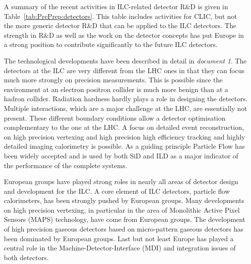 \documentclass[%
 reprint,
 amsmath,amssymb,
 aps,
]{revtex4-1}
\begin{document}


A summary of the recent  activities in ILC-related detector R\&D is given in Table~\ref{tab:PrePrep:detectors}. 
This table includes activities for CLIC, but not the more generic detector R\&D that can be applied to the 
ILC detectors. The strength in R\&D as well as the work on the detector concepts has put Europe in a strong 
position to contribute significantly to the future ILC detectors.


The technological developments have been described in detail in {\it document 
1}. The detectors at the ILC are very different from the LHC ones in that they 
can focus much more strongly on precision measurements. This is possible since 
the environment at an electron positron collider is much more benign than at a 
hadron collider. Radiation hardness hardly plays a role in designing the 
detectors. Multiple interactions, which are a major challenge at the LHC, are 
essentially not present. These different boundary conditions allow a detector 
optimisation complementary to the one at the LHC. A focus on detailed event 
reconstruction, on high precision vertexing and high precision high efficiency 
tracking and highly detailed imaging calorimetry is possible. As a guiding 
principle Particle Flow has been widely accepted and is used by both SiD and ILD 
as a major indicator of the performance of the complete systems. 

European groups have played strong roles in nearly all areas of detector design 
and development for the ILC. A core element of ILC detectors, particle flow 
calorimeters, has been strongly pushed by European groups. Many developments on 
high precision vertexing, in particular in the area of Monolithic Active Pixel 
Sensors (MAPS) technology, have come from European groups. The development of 
high precision gaseous detectors based on micro-pattern gaseous detectors has 
been dominated by European groups. Last but not least Europe has played a 
central role in the Machine-Detector-Interface (MDI) and integration issues of 
both detectors.  
\end{document}
